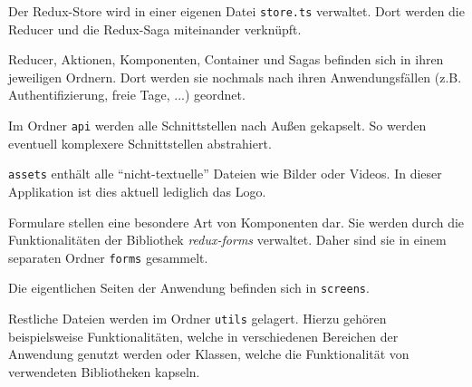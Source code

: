 Der Redux-Store wird in einer eigenen Datei \texttt{store.ts} verwaltet.
Dort werden die Reducer und die Redux-Saga miteinander verknüpft.

Reducer, Aktionen, Komponenten, Container und Sagas befinden sich in ihren jeweiligen Ordnern.
Dort werden sie nochmals nach ihren Anwendungsfällen (z.B. Authentifizierung, freie Tage, ...) geordnet.

Im Ordner \texttt{api} werden alle Schnittstellen nach Außen gekapselt.
So werden eventuell komplexere Schnittstellen abstrahiert.

\texttt{assets} enthält alle \enquote{nicht-textuelle} Dateien wie Bilder oder Videos.
In dieser Applikation ist dies aktuell lediglich das Logo.

Formulare stellen eine besondere Art von Komponenten dar.
Sie werden durch die Funktionalitäten der Bibliothek \emph{redux-forms} verwaltet.
Daher sind sie in einem separaten Ordner \texttt{forms} gesammelt.

Die eigentlichen Seiten der Anwendung befinden sich in \texttt{screens}.

Restliche Dateien werden im Ordner \texttt{utils} gelagert.
Hierzu gehören beispielsweise Funktionalitäten, welche in verschiedenen Bereichen der Anwendung genutzt werden
oder Klassen, welche die Funktionalität von verwendeten Bibliotheken kapseln.


